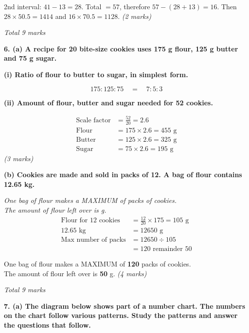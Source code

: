 \documentclass[12pt,a4paper]{article}
\newcommand{\qhead}[1]{\vspace{0.6em}\noindent\textbf{\large #1}\par\vspace{0.3em}}
\newcommand{\subhead}[1]{\vspace{0.3em}\noindent\textbf{#1}\par}
\newcommand{\qmarks}[1]{\hfill\textit{(#1)}}
\begin{document}
2nd interval: $41 - 13 = 28$. Total $= 57$, therefore $57 - (28+13) = 16$. Then $28\times 50.5 = 1414$ and $16\times 70.5 = 1128$.
\qmarks{2 marks}

\hfill\textit{Total 9 marks}

\newpage
\qhead{6. (a) A recipe for 20 bite-size cookies uses 175 g flour, 125 g butter and 75 g sugar.}

\subhead{(i) Ratio of flour to butter to sugar, in simplest form.}
\[ 175 : 125 : 75 \quad=\quad 7 : 5 : 3 \]

\subhead{(ii) Amount of flour, butter and sugar needed for 52 cookies.}
\begin{align*}
\text{Scale factor} &= \frac{52}{20} = 2.6 \\
\text{Flour} &= 175\times 2.6 = 455\text{ g} \\
\text{Butter} &= 125\times 2.6 = 325\text{ g} \\
\text{Sugar} &= 75\times 2.6 = 195\text{ g}
\end{align*}
\qmarks{3 marks}

\subhead{(b) Cookies are made and sold in packs of 12. A bag of flour contains 12.65 kg.}

\textit{One bag of flour makes a MAXIMUM of \underline{\hspace{2em}} packs of cookies.}\\
\textit{The amount of flour left over is \underline{\hspace{2em}} g.}
\begin{align*}
\text{Flour for 12 cookies} &= \frac{12}{20}\times 175 = 105\text{ g} \\
12.65\text{ kg} &= 12650\text{ g} \\
\text{Max number of packs} &= 12650 \div 105 \\
&= 120 \text{ remainder } 50
\end{align*}

One bag of flour makes a MAXIMUM of \textbf{120} packs of cookies.\\
The amount of flour left over is \textbf{50} g.
\qmarks{4 marks}

\hfill\textit{Total 9 marks}

\newpage
\qhead{7. (a) The diagram below shows part of a number chart. The numbers on the chart follow various patterns. Study the patterns and answer the questions that follow.}
\end{document}
